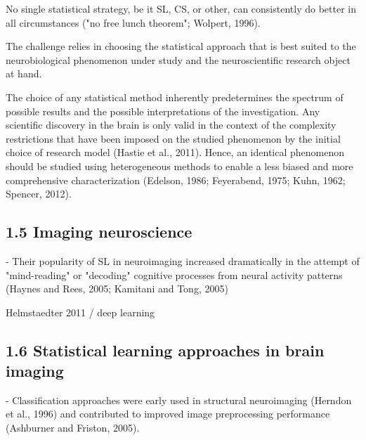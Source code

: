 \documentclass[authoryear,review,3p]{elsarticle}
\begin{document}
No single statistical strategy, be it SL, CS, or other,
can consistently
do better in all circumstances
("no free lunch theorem"; Wolpert, 1996). 

The challenge relies in choosing the statistical approach that is best suited to the neurobiological phenomenon under study and the neuroscientific research object at hand.

The choice of any statistical method inherently predetermines the spectrum of possible results and the possible interpretations of the investigation. Any scientific discovery in the brain is only valid in the context of the complexity restrictions that have been imposed on the studied phenomenon by the initial choice of research model (Hastie et al., 2011). Hence, an identical phenomenon should be studied using heterogeneous methods to enable a less biased and more comprehensive characterization (Edelson, 1986; Feyerabend, 1975; Kuhn, 1962; Spencer, 2012).



\subsection*{1.5 Imaging neuroscience}


- Their popularity of SL in neuroimaging increased dramatically in the attempt of "mind-reading" or "decoding" cognitive processes from neural activity patterns (Haynes and Rees, 2005; Kamitani and Tong, 2005)



Helmstaedter 2011 / deep learning



\subsection*{1.6 Statistical learning approaches in brain imaging}


- Classification approaches were early used in structural neuroimaging (Herndon et al., 1996) and contributed to improved image preprocessing performance (Ashburner and Friston, 2005).
\end{document}
